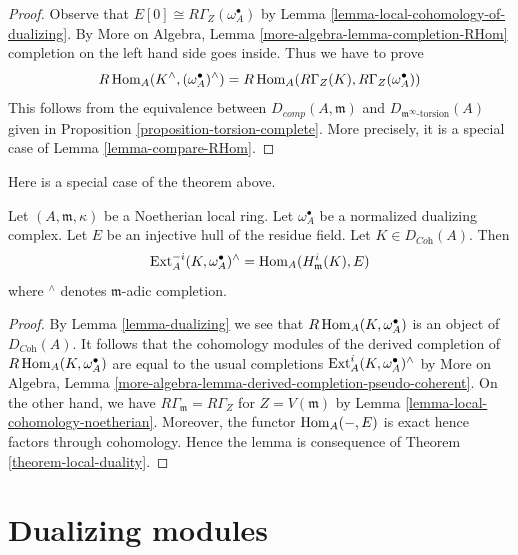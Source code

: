 \begin{proof}
Observe that $E[0] \cong R\Gamma_Z(\omega_A^\bullet)$ by
Lemma \ref{lemma-local-cohomology-of-dualizing}.
By More on Algebra, Lemma \ref{more-algebra-lemma-completion-RHom}
completion on the left hand side goes inside.
Thus we have to prove
$$
R\mathop{\mathrm{Hom}}\nolimits_A(K^\wedge, (\omega_A^\bullet)^\wedge)
=
R\mathop{\mathrm{Hom}}\nolimits_A(R\Gamma_Z(K), R\Gamma_Z(\omega_A^\bullet))
$$
This follows from the equivalence between
$D_{comp}(A, \mathfrak m)$ and $D_{\mathfrak m^\infty\text{-torsion}}(A)$
given in Proposition \ref{proposition-torsion-complete}.
More precisely, it is a special case of Lemma \ref{lemma-compare-RHom}.
\end{proof}

\noindent
Here is a special case of the theorem above.

\begin{lemma}
\label{lemma-special-case-local-duality}
Let $(A, \mathfrak m, \kappa)$ be a Noetherian local ring.
Let $\omega_A^\bullet$ be a normalized dualizing complex.
Let $E$ be an injective hull of the residue field.
Let $K \in D_{\textit{Coh}}(A)$. Then
$$
\mathop{\mathrm{Ext}}\nolimits^{-i}_A(K, \omega_A^\bullet)^\wedge =
\mathop{\mathrm{Hom}}\nolimits_A(H^i_{\mathfrak m}(K), E)
$$
where ${}^\wedge$ denotes $\mathfrak m$-adic completion.
\end{lemma}

\begin{proof}
By Lemma \ref{lemma-dualizing} we see that $R\mathop{\mathrm{Hom}}\nolimits_A(K, \omega_A^\bullet)$
is an object of $D_{\textit{Coh}}(A)$.
It follows that the cohomology modules of the derived completion
of $R\mathop{\mathrm{Hom}}\nolimits_A(K, \omega_A^\bullet)$ are equal to the usual completions
$\mathop{\mathrm{Ext}}\nolimits^i_A(K, \omega_A^\bullet)^\wedge$ by
More on Algebra, Lemma
\ref{more-algebra-lemma-derived-completion-pseudo-coherent}.
On the other hand, we have $R\Gamma_{\mathfrak m} = R\Gamma_Z$
for $Z = V(\mathfrak m)$ by Lemma \ref{lemma-local-cohomology-noetherian}.
Moreover, the functor $\mathop{\mathrm{Hom}}\nolimits_A(-, E)$ is exact hence
factors through cohomology.
Hence the lemma is consequence of
Theorem \ref{theorem-local-duality}.
\end{proof}





\section{Dualizing modules}
\label{section-dualizing-module}

